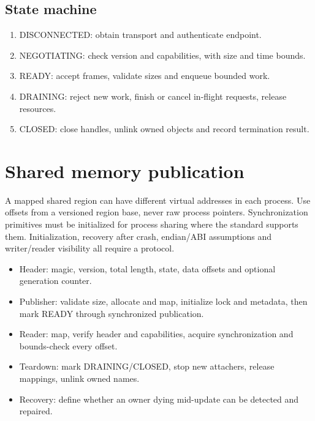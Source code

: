 \documentclass[11pt,letterpaper,oneside]{report}
\begin{document}
\begin{center}
\end{center}\section{State machine}
\begin{enumerate}
\item DISCONNECTED: obtain transport and authenticate endpoint.
\item NEGOTIATING: check version and capabilities, with size and time bounds.
\item READY: accept frames, validate sizes and enqueue bounded work.
\item DRAINING: reject new work, finish or cancel in-flight requests, release resources.
\item CLOSED: close handles, unlink owned objects and record termination result.
\end{enumerate}
\chapter{Shared memory publication}
A mapped shared region can have different virtual addresses in each process. Use offsets from a versioned region base, never raw process pointers. Synchronization primitives must be initialized for process sharing where the standard supports them. Initialization, recovery after crash, endian/ABI assumptions and writer/reader visibility all require a protocol.

\begin{itemize}
\item Header: magic, version, total length, state, data offsets and optional generation counter.
\item Publisher: validate size, allocate and map, initialize lock and metadata, then mark READY through synchronized publication.
\item Reader: map, verify header and capabilities, acquire synchronization and bounds-check every offset.
\item Teardown: mark DRAINING/CLOSED, stop new attachers, release mappings, unlink owned names.
\item Recovery: define whether an owner dying mid-update can be detected and repaired.
\end{itemize}
\end{document}

